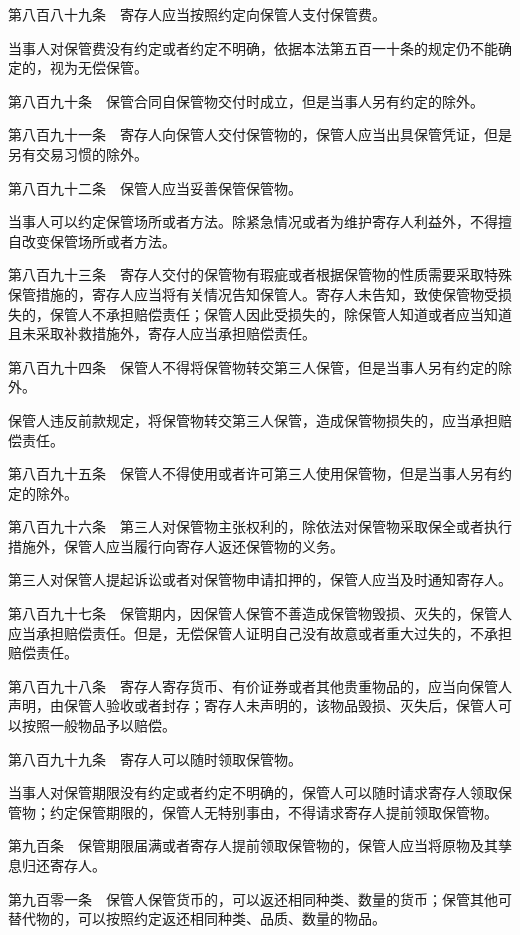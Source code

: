 \documentclass[UTF8,12pt,a4paper]{ctexbook}
\begin{document}
第八百八十九条　寄存人应当按照约定向保管人支付保管费。

当事人对保管费没有约定或者约定不明确，依据本法第五百一十条的规定仍不能确定的，视为无偿保管。

第八百九十条　保管合同自保管物交付时成立，但是当事人另有约定的除外。

第八百九十一条　寄存人向保管人交付保管物的，保管人应当出具保管凭证，但是另有交易习惯的除外。

第八百九十二条　保管人应当妥善保管保管物。

当事人可以约定保管场所或者方法。除紧急情况或者为维护寄存人利益外，不得擅自改变保管场所或者方法。

第八百九十三条　寄存人交付的保管物有瑕疵或者根据保管物的性质需要采取特殊保管措施的，寄存人应当将有关情况告知保管人。寄存人未告知，致使保管物受损失的，保管人不承担赔偿责任；保管人因此受损失的，除保管人知道或者应当知道且未采取补救措施外，寄存人应当承担赔偿责任。

第八百九十四条　保管人不得将保管物转交第三人保管，但是当事人另有约定的除外。

保管人违反前款规定，将保管物转交第三人保管，造成保管物损失的，应当承担赔偿责任。

第八百九十五条　保管人不得使用或者许可第三人使用保管物，但是当事人另有约定的除外。

第八百九十六条　第三人对保管物主张权利的，除依法对保管物采取保全或者执行措施外，保管人应当履行向寄存人返还保管物的义务。

第三人对保管人提起诉讼或者对保管物申请扣押的，保管人应当及时通知寄存人。

第八百九十七条　保管期内，因保管人保管不善造成保管物毁损、灭失的，保管人应当承担赔偿责任。但是，无偿保管人证明自己没有故意或者重大过失的，不承担赔偿责任。

第八百九十八条　寄存人寄存货币、有价证券或者其他贵重物品的，应当向保管人声明，由保管人验收或者封存；寄存人未声明的，该物品毁损、灭失后，保管人可以按照一般物品予以赔偿。

第八百九十九条　寄存人可以随时领取保管物。

当事人对保管期限没有约定或者约定不明确的，保管人可以随时请求寄存人领取保管物；约定保管期限的，保管人无特别事由，不得请求寄存人提前领取保管物。

第九百条　保管期限届满或者寄存人提前领取保管物的，保管人应当将原物及其孳息归还寄存人。

第九百零一条　保管人保管货币的，可以返还相同种类、数量的货币；保管其他可替代物的，可以按照约定返还相同种类、品质、数量的物品。
\end{document}

